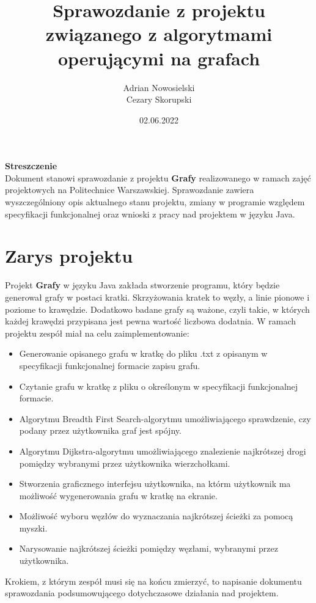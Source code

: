 \documentclass[10pt]{article}
\title{Sprawozdanie z projektu związanego z algorytmami operującymi na grafach}
\author{Adrian Nowosielski\\Cezary Skorupski}
\date{02.06.2022}
\begin{document}
\maketitle
\thispagestyle{empty}
\newpage
\thispagestyle{empty}
\begin{center}
    \textbf{\Large{Streszczenie}}\\
    Dokument stanowi sprawozdanie z projektu \textbf{Grafy} realizowanego w ramach zajęć projektowych na Politechnice Warszawskiej. Sprawozdanie zawiera wyszczególniony opis aktualnego stanu projektu, zmiany w programie względem specyfikacji funkcjonalnej oraz wnioski z pracy nad projektem w języku Java.
\end{center}
\newpage
\newpage
\begin{center}
    \tableofcontents
    \thispagestyle{empty}
\end{center}
\newpage
{}
\section{Zarys projektu}
Projekt \textbf{Grafy} w języku Java zakłada stworzenie programu, który będzie generował grafy w postaci kratki. Skrzyżowania kratek to węzły, a linie pionowe i poziome to krawędzie. Dodatkowo badane grafy są ważone, czyli takie, w których każdej krawędzi przypisana jest pewna wartość liczbowa dodatnia. W ramach projektu zespół miał na celu zaimplementowanie:
\begin{itemize}
    \item Generowanie opisanego grafu w kratkę do pliku .txt z opisanym w specyfikacji funkcjonalnej formacie zapisu grafu.
    \item Czytanie grafu w kratkę z pliku o określonym w specyfikacji funkcjonalnej formacie.
    \item Algorytmu Breadth First Search-algorytmu umożliwiającego sprawdzenie, czy podany przez użytkownika graf jest spójny.
    \item Algorytmu Dijkstra-algorytmu umożliwiającego znalezienie najkrótszej drogi pomiędzy wybranymi przez użytkownika wierzchołkami.
    \item Stworzenia graficznego interfejsu użytkownika, na którm użytkownik ma możliwość wygenerowania grafu w kratkę na ekranie.
    \item Możliwość wyboru węzłów do wyznaczania najkrótszej ścieżki za pomocą myszki.
    \item Narysowanie najkrótszej ścieżki pomiędzy węzłami, wybranymi przez użytkownika.
\end{itemize}
Krokiem, z którym zespół musi się na końcu zmierzyć, to napisanie  dokumentu sprawozdania podsumowującego dotychczasowe działania nad projektem.
\end{document}
